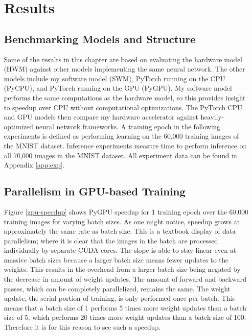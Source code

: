 \chapter{Results}\label{results}
\section{Benchmarking Models and Structure}
Some of the results in this chapter are based on evaluating the hardware model (HWM) against other models implementing the same neural network. The other models include my software model (SWM), PyTorch running on the CPU (PyCPU), and PyTorch running on the GPU (PyGPU). My software model performs the same computations as the hardware model, so this provides insight to speedup over CPU without computational optimizations. The PyTorch CPU and GPU models then compare my hardware accelerator against heavily-optimized neural network frameworks. A training epoch in the following experiments is defined as performing learning on the 60,000 training images of the MNIST dataset. Inference experiments measure time to perform inference on all 70,000 images in the MNIST dataset. All experiment data can be found in Appendix \ref{app:exp}.

\section{Parallelism in GPU-based Training}
Figure \ref{gpu-speedup} shows PyGPU speedup for 1 training epoch over the 60,000 training images for varying batch sizes. As one might notice, speedup grows at approximately the same rate as batch size. This is a textbook display of data parallelism; where it is clear that the images in the batch are processed individually by separate CUDA cores. The slope is able to stay linear even at massive batch sizes because a larger batch size means fewer updates to the weights. This results in the overhead from a larger batch size being negated by the decrease in amount of weight updates. The amount of forward and backward passes, which can be completely parallelized, remains the same. The weight update, the serial portion of training, is only performed once per batch. This means that a batch size of 1 performs 5 times more weight updates than a batch size of 5, which performs 20 times more weight updates than a batch size of 100. Therefore it is for this reason to see such a  speedup.  

